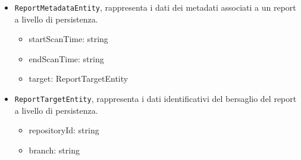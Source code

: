\documentclass[a4paper, 11pt]{article}
\newcounter{subsubsubsection}[subsubsection]
\newcounter{subsubsubsubsection}[subsubsubsection]
\begin{document}
\begin{itemize}
\begin{itemize}
      \item \texttt{ReportMetadataEntity}, rappresenta i dati dei metadati associati a un report a livello di persistenza.
      \begin{itemize}
          \item startScanTime: string
          \item endScanTime: string
          \item target: ReportTargetEntity
      \end{itemize}

      \item \texttt{ReportTargetEntity}, rappresenta i dati identificativi del bersaglio del report a livello di persistenza.
      \begin{itemize}
          \item repositoryId: string
          \item branch: string
      \end{itemize}
  \end{itemize}
\end{itemize}

\end{document}
